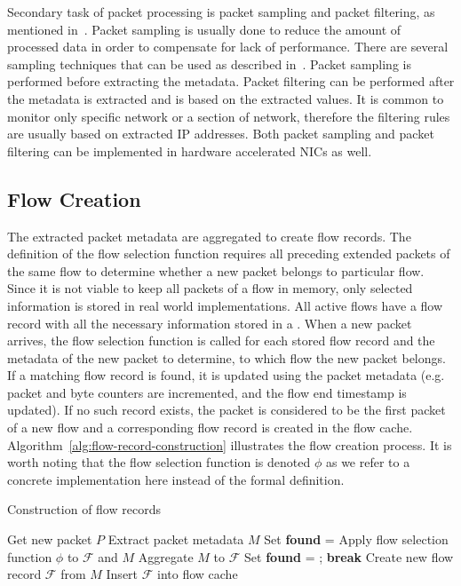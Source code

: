 Secondary task of packet processing is packet sampling and packet filtering, as mentioned in~\cite{rfc5470}. Packet sampling is usually done to reduce the amount of processed data in order to compensate for lack of performance. There are several sampling techniques that can be used as described in~\cite{rfc5476}. Packet sampling is performed before extracting the metadata. Packet filtering can be performed after the metadata is extracted and is based on the extracted values. It is common to monitor only specific network or a section of network, therefore the filtering rules are usually based on extracted IP addresses. Both packet sampling and packet filtering can be implemented in hardware accelerated NICs as well.

\subsection{Flow Creation}\label{subsec:flow-creation}

The extracted packet metadata are aggregated to create flow records. The definition of the flow selection function requires all preceding extended packets of the same flow to determine whether a new packet belongs to particular flow. Since it is not viable to keep all packets of a flow in memory, only selected information is stored in real world implementations. All active flows have a flow record with all the necessary information stored in a \emph{}. When a new packet arrives, the flow selection function is called for each stored flow record and the metadata of the new packet to determine, to which flow the new packet belongs. If a matching flow record is found, it is updated using the packet metadata (e.g. packet and byte counters are incremented, and the flow end timestamp is updated). If no such record exists, the packet is considered to be the first packet of a new flow and a corresponding flow record is created in the flow cache. Algorithm~\ref{alg:flow-record-construction} illustrates the flow creation process. It is worth noting that the flow selection function is denoted $\phi$ as we refer to a concrete implementation here instead of the formal definition.

\begin{algorithm}
    \caption{Construction of flow records}
    \label{alg:flow-record-construction}
    \begin{algorithmic}[1]
        \LOOP 
            \STATE Get new packet $P$
            \STATE Extract packet metadata $M$
            \STATE Set \textbf{found} = \FALSE
                \STATE Apply flow selection function $\phi$ to $\mathcal{F}$ and $M$
                    \STATE Aggregate $M$ to $\mathcal{F}$
                    \STATE Set \textbf{found} = \TRUE;
                    \STATE \textbf{break}
                \ENDIF
            \ENDFOR
                \STATE Create new flow record $\mathcal{F}$ from $M$
                \STATE Insert $\mathcal{F}$ into flow cache
            \ENDIF
        \ENDLOOP
    \end{algorithmic}
\end{algorithm}

